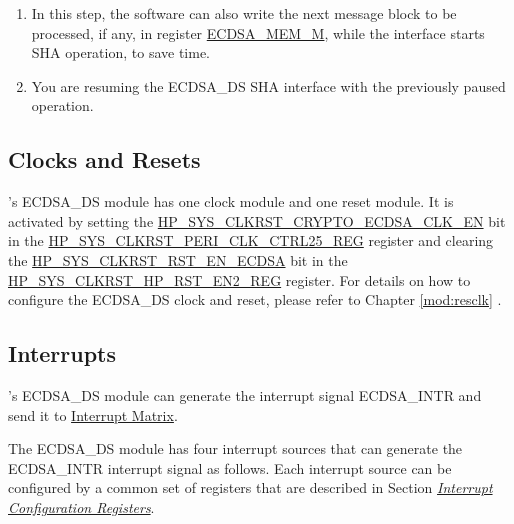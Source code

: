 \documentclass[main\_\_EN.tex]{subfiles}
\begin{document}
\begin{tiplisting}\label{others:ecdsa-note-sha}
\vspace{-2.5em}
\begin{enumerate}
\item In this step, the software can also write the next message block to be processed, if any, in register \hyperref[tab:ecdsa-memory]{ECDSA\_MEM\_M}, while the interface starts SHA operation, to save time.
\item You are resuming the ECDSA\_DS SHA interface with the previously paused operation.
\end{enumerate}
\end{tiplisting}

\subsection{Clocks and Resets}

\chipname{}'s ECDSA\_DS module has one clock module and one reset module. It is activated by setting the \hyperref[fielddesc:HPSYSCLKRSTCRYPTOECDSACLKEN]{HP\_SYS\_CLKRST\_CRYPTO\_ECDSA\_CLK\_EN} bit in the \hyperref[regdesc:HPSYSCLKRSTPERICLKCTRL25REG]{HP\_SYS\_CLKRST\_PERI\_CLK\_CTRL25\_REG} register and clearing the \hyperref[fielddesc:HPSYSCLKRSTRSTENECDSA]{HP\_SYS\_CLKRST\_RST\_EN\_ECDSA} bit in the \hyperref[regdesc:HPSYSCLKRSTHPRSTEN2REG]{HP\_SYS\_CLKRST\_HP\_RST\_EN2\_REG} register. For details on how to configure the ECDSA\_DS clock and reset, please refer to Chapter \ref{mod:resclk} \textit{}.

\subsection{Interrupts}
\label{sec:ecdsa-interrupt}

\chipname{}'s ECDSA\_DS module can generate the interrupt signal ECDSA\_INTR and send it to \hyperref[mod:intmtrx]{Interrupt Matrix}.

The ECDSA\_DS module has four interrupt sources that can generate the ECDSA\_INTR interrupt signal as follows. Each interrupt source can be configured by a common set of registers that are described in Section \hyperref[interrupt-config-registers]{\textit{Interrupt Configuration Registers}}.
\end{document}
